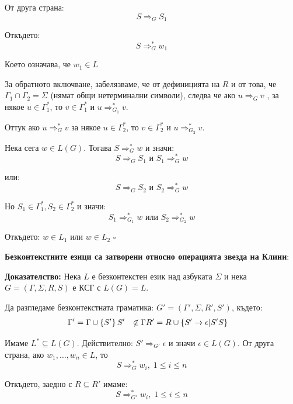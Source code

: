 \documentclass{article}
\renewcommand{\\}{\newline}
\newcommand{\doc}{\textbf{Доказателство: }}
\newcommand{\proven}{\hfill $\square$}
\begin{document}
      От друга страна: \[
        S \Rightarrow_{G} S_1
      \] 

      Откъдето: \[
        S\Rightarrow^{*}_{G} w_{1}
      \] 

      Което означава, че \(w_{1} \in L\)  

      За обратното включване, забелязваме, че от дефиницията на \(R\) и от това, че \(\Gamma_{1} \cap \Gamma_2 = \Sigma\) (нямат общи нетерминални символи), следва че ако \(u \Rightarrow_{G} v\) , за някое \(u \in \Gamma_{1}^{*}\), то \(v \in \Gamma_{1}^{*}\) и \(u \Rightarrow_{G_1}^{*} v\). 

      Оттук ако \(u \Rightarrow_{G}^{*} v\) за някое  \(u \in \Gamma_{2}^{*}\), то \(v \in \Gamma_{2}^{*}\) и \(u \Rightarrow_{G_2}^{*} v\). 

      Нека сега \(w \in L(G)\). Тогава \(S \Rightarrow^{*}_{G} w\) и значи:\[
        S \Rightarrow_{G} S_{1} \text{ и }S_{1} \Rightarrow^{*}_{G} w
      \]   

      или: \[
        S \Rightarrow_{G} S_{2} \text{ и }S_{2} \Rightarrow^{*}_{G} w
      \] 

      Но \(S_{1} \in \Gamma_{1}^{*}, S_{2} \in \Gamma_{2}^{*}\)  и значи: 
      \[
        S_{1} \Rightarrow^{*}_{G_1} w \text{ или }S_{2} \Rightarrow^{*}_{G_2} w
      \] 

      Откъдето: \(w \in L_{1}\) или \(w \in L_{2}\) \proven  
      
      \textbf{Безконтекстните езици са затворени относно операцията звезда на Клини}:

      \doc Нека \(L\) е безконтекстен език над азбуката \(\Sigma\) и нека \(G = \left(\Gamma, \Sigma, R, S\right)\) е КСГ с \(L(G) = L\). 

      Да разгледаме безконтекстната граматика: \(G' = \left(\Gamma', \Sigma, R', S'\right)\), където: \begin{align*}
      \Gamma' &= \Gamma \cup \left\{S'\right\} \\
      S' &\not\in \Gamma \\
      R' &= R \cup \left\{S' \to \epsilon | S'S\right\}
      \end{align*}

      Имаме \(L^{*} \subseteq L(G)\). Действително: \(S' \Rightarrow_{G'} \epsilon\) и значи \(\epsilon \in L(G)\). От друга страна, ако \(w_{1}, \dots, w_{n} \in L\), то \[
        S\Rightarrow_{G}^{*} w_{i},\; 1\leq i \leq n
      \]   

      Откъдето, заедно с \(R \subseteq R'\) имаме: \[
        S\Rightarrow_{G'}^{*} w_{i},\; 1\leq i \leq n
      \]  
\end{document}
